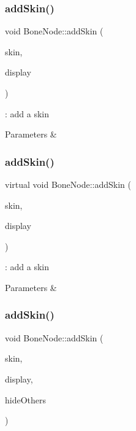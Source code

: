 \subsubsection{\texorpdfstring{add\+Skin()}{addSkin()}\hspace{0.1cm}{\footnotesize\ttfamily [1/4]}}
{\footnotesize\ttfamily void Bone\+Node\+::add\+Skin (\begin{DoxyParamCaption}\item[{Skin\+Node $\ast$}]{skin,  }\item[{bool}]{display }\end{DoxyParamCaption})\hspace{0.3cm}{\ttfamily [virtual]}}



\+: add a skin 


\begin{DoxyParams}{Parameters}
{\em } & \\
\hline
\end{DoxyParams}
\mbox{\label{classBoneNode_a19aef4f970ed1e9043bbd0b9e2809189}} 
\subsubsection{\texorpdfstring{add\+Skin()}{addSkin()}\hspace{0.1cm}{\footnotesize\ttfamily [2/4]}}
{\footnotesize\ttfamily virtual void Bone\+Node\+::add\+Skin (\begin{DoxyParamCaption}\item[{Skin\+Node $\ast$}]{skin,  }\item[{bool}]{display }\end{DoxyParamCaption})\hspace{0.3cm}{\ttfamily [virtual]}}



\+: add a skin 


\begin{DoxyParams}{Parameters}
{\em } & \\
\hline
\end{DoxyParams}
\mbox{\label{classBoneNode_a2e4e12608df751791f7239dcc3f0dd36}} 
\subsubsection{\texorpdfstring{add\+Skin()}{addSkin()}\hspace{0.1cm}{\footnotesize\ttfamily [3/4]}}
{\footnotesize\ttfamily void Bone\+Node\+::add\+Skin (\begin{DoxyParamCaption}\item[{Skin\+Node $\ast$}]{skin,  }\item[{bool}]{display,  }\item[{bool}]{hide\+Others }\end{DoxyParamCaption})\hspace{0.3cm}{\ttfamily [virtual]}}




